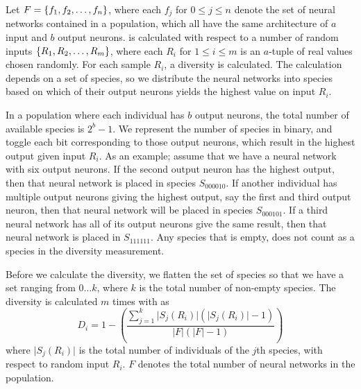 Let $F = \left\{ f_1, f_2, \dots, f_n \right\}$, where each $f_j$ for $0 \leq j \leq n$ denote the set of neural networks contained in a population, which all have the same architecture of $a$ input and $b$ output neurons. \dia{} is calculated with respect to a number of random inputs $\left\{ R_1, R_2, \dots, R_m \right\}$, where each $R_i$ for $1 \leq i \leq m$ is an $a$-tuple of real values chosen randomly. For each sample $R_i$, a diversity is calculated. The calculation depends on a set of species, so we distribute the neural networks into species based on which of their output neurons yields the highest value on input $R_i$. 

In a population where each individual has $b$ output neurons, the total number of available species is $2^b - 1$. We represent the number of species in binary, and toggle each bit corresponding to those output neurons, which result in the highest output given input $R_i$. As an example; assume that we have a neural network with six output neurons. If the second output neuron has the highest output, then that neural network is placed in species $S_{000010}$. If another individual has multiple output neurons giving the highest output, say the first and third output neuron, then that neural network will be placed in species $S_{000101}$. If a third neural network has all of its output neurons give the same result, then that neural network is placed in $S_{111111}$. Any species that is empty, does not count as a species in the diversity measurement.


%
%


Before we calculate the diversity, we flatten the set of species so that we have a set ranging from $0 \dots k$, where $k$ is the total number of non-empty species. The diversity is calculated $m$ times with \dia{} as
%
\begin{equation*}\label{eq:sdi}
  D_i = 1 - \left(\frac{\sum_{j=1}^{k}\lvert S_j\left(R_i\right)\rvert\left(\lvert S_j\left(R_i\right)\rvert - 1\right)}{\lvert F\rvert \left(\lvert F\rvert - 1\right)}\right) 
\end{equation*}
%
where $\lvert S_j(R_i)\rvert$ is the total number of individuals of the $j$th species, with respect to random input $R_i$. %
$F$ denotes the total number of neural networks in the population. 

